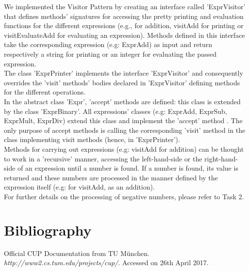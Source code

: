 \documentclass[paper=a4, fontsize=11pt]{scrartcl}
\numberwithin{equation}{section}		%
\numberwithin{figure}{section}			%
\numberwithin{table}{section}				%
\begin{document}
We implemented the Visitor Pattern by creating an interface called 'ExprVisitor' that defines methods' signatures for accessing the pretty printing and evaluation functions for the different expressions (e.g., for addition, visitAdd for printing or visitEvaluateAdd for evaluating an expression). Methods defined in this interface take the corresponding expression (e.g: ExprAdd) as input and return respectively a string for printing or an integer for evaluating the passed expression.  \\
The class 'ExprPrinter' implements the interface 'ExprVisitor' and consequently overrides the 'visit' methods' bodies declared in 'ExprVisitor' defining methods for the different operations. \\
In the abstract class 'Expr', 'accept' methods are defined: this class is extended by the class 'ExprBinary'. All expressions' classes (e.g: ExprAdd, ExprSub, ExprMult, ExprDiv) extend this class and implement the 'accept' method . The only purpose of accept methods is calling the corresponding 'visit' method in the class implementing visit methods (hence, in 'ExprPrinter'). \\
Methods for carrying out expressions (e.g: visitAdd for addition) can be thought to work in a 'recursive' manner, accessing the left-hand-side or the right-hand-side of an expression until a number is found. If a number is found, its value is returned and these numbers are processed in the manner defined by the expression itself (e.g: for visitAdd, as an addition). \\
For further details on the processing of negative numbers, please refer to Task 2.


 
\section*{Bibliography}
\begin{thebibliography}{9}%
Official CUP Documentation from TU M\"unchen. \textit{http://www2.cs.tum.edu/projects/cup/}. Accessed on 26th April 2017.
\end{thebibliography}
\end{document}
